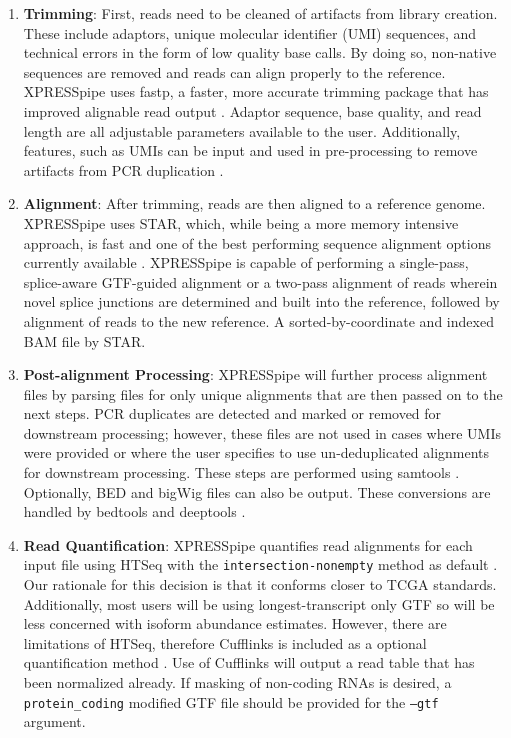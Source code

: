 \documentclass[11pt, a4paper, oneside]{article}
\begin{document}
\begin{enumerate}
  \item \textbf{Trimming}: First, reads need to be cleaned of artifacts from library creation. These include adaptors, unique molecular identifier (UMI) sequences, and technical errors in the form of low quality base calls. By doing so, non-native sequences are removed and reads can align properly to the reference. XPRESSpipe uses fastp, a faster, more accurate trimming package that has improved alignable read output \cite{fastp}. Adaptor sequence, base quality, and read length are all adjustable parameters available to the user. Additionally, features, such as UMIs can be input and used in pre-processing to remove artifacts from PCR duplication \cite{umi}.
  \item \textbf{Alignment}: After trimming, reads are then aligned to a reference genome. XPRESSpipe uses STAR, which, while being a more memory intensive approach, is fast and one of the  best performing sequence alignment options currently available \cite{star, baruzzo_natmeth}. XPRESSpipe is capable of performing a single-pass, splice-aware GTF-guided alignment or a two-pass alignment of reads wherein novel splice junctions are determined and built into the reference, followed by alignment of reads to the new reference. A sorted-by-coordinate and indexed BAM file by STAR.
  \item \textbf{Post-alignment Processing}: XPRESSpipe will further process alignment files by parsing files for only unique alignments that are then passed on to the next steps. PCR duplicates are detected and marked or removed for downstream processing; however, these files are not used in cases where UMIs were provided or where the user specifies to use un-deduplicated alignments for downstream processing. These steps are performed using samtools \cite{samtools}. Optionally, BED and bigWig files can also be output. These conversions are handled by bedtools \cite{bedtools} and deeptools \cite{deeptools}.
  \item \textbf{Read Quantification}: XPRESSpipe quantifies read alignments for each input file using HTSeq with the \texttt{intersection-nonempty} method as default \cite{htseq, count_benchmark}. Our rationale for this decision is that it conforms closer to TCGA standards. Additionally, most users will be using longest-transcript only GTF so will be less concerned with isoform abundance estimates. However, there are limitations of HTSeq, therefore Cufflinks is included as a optional quantification method \cite{cufflinks, count_benchmark}. Use of Cufflinks will output a read table that has been normalized already. If masking of non-coding RNAs is desired, a \texttt{protein\_coding} modified GTF file should be provided for the \texttt{--gtf} argument.

\end{enumerate}
\end{document}
